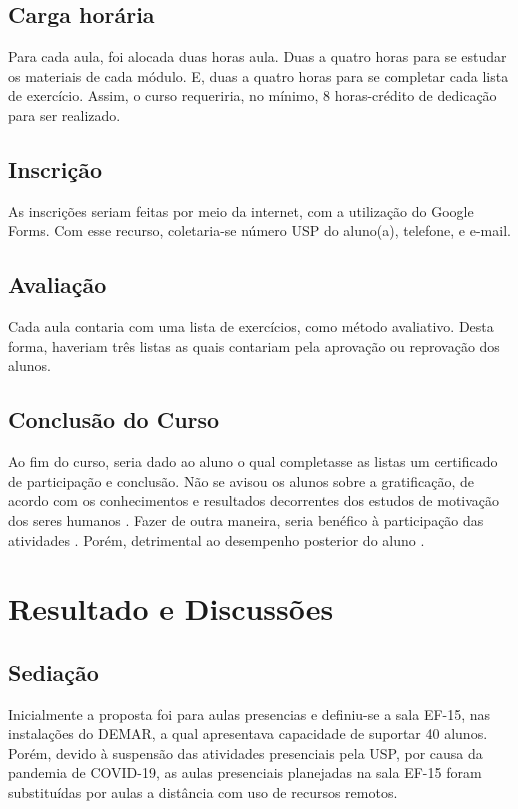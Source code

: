 \documentclass[
12pt,				%
openright,			%
oneside,			%
a4paper,			%
english,			%
french,				%
spanish,			%
brazil,				%
]{abntex2}
\begin{document}
\section{Carga horária}
Para cada aula, foi alocada duas horas aula. Duas a quatro horas para se estudar
os materiais de cada módulo. E, duas a quatro horas para se completar cada lista
de exercício. Assim, o curso requeriria, no mínimo, 8 horas-crédito de dedicação para ser realizado.
\section{Inscrição}

As inscrições seriam feitas por meio da internet, com a utilização do Google Forms.
Com esse recurso, coletaria-se número USP do aluno(a), telefone, e e-mail.

\section{Avaliação}
Cada aula contaria com uma lista de exercícios, como método avaliativo. Desta forma,
haveriam três listas as quais contariam pela aprovação ou reprovação dos alunos.

\section{Conclusão do Curso}

Ao fim do curso, seria dado ao aluno o qual completasse as listas um certificado
de participação e conclusão. Não se avisou os alunos sobre a gratificação, de
acordo com os conhecimentos e resultados decorrentes dos estudos de motivação
dos seres humanos \cite{deci2017self}. Fazer de outra maneira,
seria benéfico à participação das atividades \cite{hendijani2016intrinsic}.
Porém, detrimental ao desempenho posterior do aluno \cite{ariely2009large}.

\chapter{Resultado e Discussões}

\section{Sediação}
Inicialmente a proposta foi para aulas presencias e definiu-se a sala EF-15, nas instalações do DEMAR, a qual apresentava capacidade de suportar 40 alunos. Porém, devido à
suspensão das atividades presenciais pela USP, por causa da pandemia de
COVID-19, as aulas presenciais planejadas na sala EF-15 foram
substituídas por aulas a distância com uso de recursos
remotos.
\end{document}
